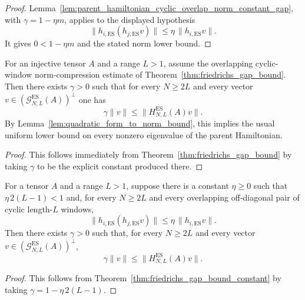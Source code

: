 \begin{proof}
    \leanok
    Lemma~\ref{lem:parent_hamiltonian_cyclic_overlap_norm_constant_gap}, with
    $\gamma=1-\eta m$, applies to the displayed hypothesis
    \[
        \|h_{i,\mathrm{ES}}(h_{j,\mathrm{ES}}v)\|
        \le
        \eta\,\|h_{i,\mathrm{ES}}v\|.
    \]
    It gives $0<1-\eta m$ and the stated norm lower bound.
\end{proof}

\begin{theorem}
    \label{thm:parent_hamiltonian_gapped}
    \leanok
    For an injective tensor $A$ and a range $L > 1$, assume the overlapping
    cyclic-window norm-compression estimate of
    Theorem~\ref{thm:friedrichs_gap_bound}. Then there exists $\gamma > 0$ such
    that for every $N \ge 2L$ and every vector
    $v \in (\mathcal G_{N,L}^{\mathrm{ES}}(A))^{\perp}$ one has
    \[
        \gamma \|v\| \le \|H_{N,L}^{\mathrm{ES}}(A) v\|.
    \]
    By Lemma~\ref{lem:quadratic_form_to_norm_bound}, this implies the usual
    uniform lower bound on every nonzero eigenvalue of the parent Hamiltonian.
\end{theorem}

\begin{proof}
    \leanok
    This follows immediately from Theorem~\ref{thm:friedrichs_gap_bound} by
    taking $\gamma$ to be the explicit constant produced there.
\end{proof}

\begin{theorem}
    \label{thm:parent_hamiltonian_gapped_constant}
    \leanok
    For a tensor $A$ and a range $L>1$, suppose there is a constant
    $\eta\ge0$ such that $\eta\,2(L-1)<1$ and, for every $N\ge2L$ and every
    overlapping off-diagonal pair of cyclic length-$L$ windows,
    \[
        \|h_{i,\mathrm{ES}}(h_{j,\mathrm{ES}}v)\|
        \le
        \eta\,\|h_{i,\mathrm{ES}}v\|.
    \]
    Then there exists $\gamma>0$ such that, for every $N\ge2L$ and every vector
    $v\in(\mathcal G_{N,L}^{\mathrm{ES}}(A))^\perp$,
    \[
        \gamma\|v\|\le \|H_{N,L}^{\mathrm{ES}}(A)v\|.
    \]
\end{theorem}

\begin{proof}
    \leanok
    This follows from Theorem~\ref{thm:friedrichs_gap_bound_constant} by taking
    $\gamma=1-\eta\,2(L-1)$.
\end{proof}
